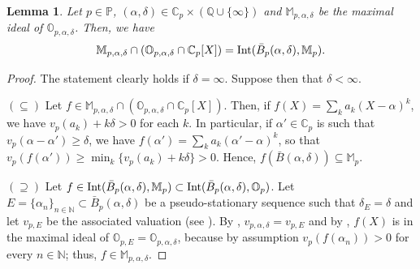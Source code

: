 \documentclass[10pt]{article}
\numberwithin{equation}{section}
\newtheorem{Lem}[equation]{Lemma}
\theoremstyle{definition}
\theoremstyle{definition}
\newcommand{\F}{\mathbb{F}}
\newcommand{\Q}{\mathbb{Q}}
\newcommand{\N}{\mathbb{N}}
\newcommand{\Z}{\mathbb{Z}}
\newcommand{\C}{\mathbb{C}}
\renewcommand{\O}{\mathbb{O}}
\newcommand{\PP}{\mathbb{P}}
\newcommand{\Int}{\textnormal{Int}}
\begin{document}
\begin{Lem}\label{IntBallmaximal}
Let $p\in\PP$, $(\alpha,\delta)\in\C_p\times(\Q\cup\{\infty\})$ and $\mathbb M_{p,\alpha,\delta}$ be 
the maximal ideal of $\O_{p,\alpha,\delta}$. Then,  we have
$$\mathbb M_{p,\alpha,\delta}\cap(\O_{p,\alpha,\delta}\cap\C_p[X])=\Int(\bar B_p(\alpha,\delta),\mathbb M_p).$$
\end{Lem}
\begin{proof}
The statement clearly holds if $\delta=\infty$. Suppose then that $\delta<\infty$.

$(\subseteq)$ Let $f\in \mathbb{M}_{p,\alpha,\delta}\cap(\O_{p,\alpha,\delta}\cap\C_p[X])$. Then, if $f(X)=\sum\limits_k a_k(X-\alpha)^k$, we have $v_p(a_k)+k\delta>0$ for each $k$. In particular, if $\alpha'\in\C_p$ is such that $v_p(\alpha-\alpha')\geq\delta$, we have $f(\alpha')=\sum\limits_k a_k(\alpha'-\alpha)^k$, so that $v_p(f(\alpha'))\geq\min_k\{v_p(a_k)+k\delta\}>0$. Hence, $f(\bar B(\alpha,\delta))\subseteq\mathbb M_p$.

$(\supseteq)$ Let $f\in \Int(\bar B_p(\alpha,\delta),\mathbb M_p)\subset\Int(\bar B_p(\alpha,\delta),\O_p)$. Let $E=\{\alpha_n\}_{n\in\N}\subset\bar B_p(\alpha,\delta)$ be a pseudo-stationary sequence such that $\delta_E=\delta$ and let $v_{p,E}$ be the associated valuation (see \cite{PS2}). By \cite[Proposition 3.7]{PS2}, $v_{p,\alpha,\delta}=v_{p,E}$ and by \cite[Theorem 3.4]{PS2}, $f(X)$ is in the maximal ideal of $\O_{p,E}=\O_{p,\alpha,\delta}$, because by assumption $v_p(f(\alpha_n))>0$ for every $n\in\N$; thus, $f\in \mathbb{M}_{p,\alpha,\delta}$.
\end{proof}

\vskip0.2cm
\end{document}
